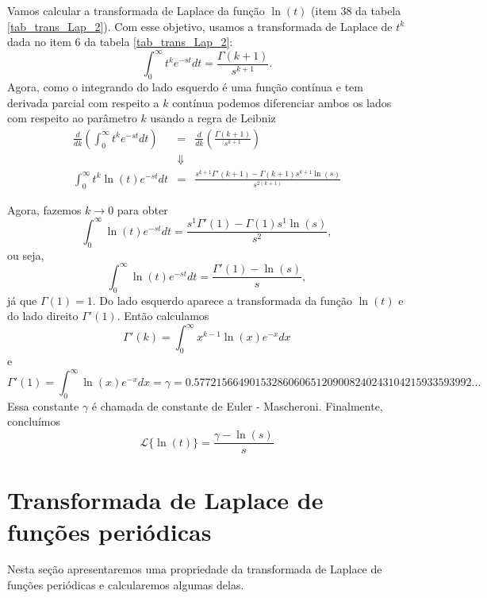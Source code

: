 \begin{ex}Vamos calcular a transformada de Laplace da função $\ln(t)$ (item 38 da tabela \ref{tab_trans_Lap_2}). Com esse objetivo, usamos a transformada de Laplace de $t^k$ dada no item 6 da tabela \ref{tab_trans_Lap_2}:
$$
\int_0^\infty t^ke^{-st}dt=\frac{\Gamma(k+1)}{s^{k+1}}.
$$
Agora, como o integrando do lado esquerdo é uma função contínua e tem derivada parcial com respeito a $k$ contínua podemos diferenciar ambos os lados com respeito ao parâmetro $k$ usando a regra de Leibniz
\begin{eqnarray*}
\frac{d}{dk}\left(\int_0^\infty t^ke^{-st}dt\right)&=&\frac{d}{dk}\left(\frac{\Gamma(k+1)}{s^{k+1}}\right)\\
&\Downarrow&\\
\int_0^\infty t^k \ln(t) e^{-st}dt&=&\frac{s^{k+1}\Gamma'(k+1)-\Gamma(k+1)s^{k+1}\ln(s)}{s^{2(k+1)}}
\end{eqnarray*}


Agora, fazemos $k\to 0$ para obter
$$
\int_0^\infty \ln(t) e^{-st}dt=\frac{s^{1}\Gamma'(1)-\Gamma(1)s^{1}\ln(s)}{s^{2}},
$$
ou seja,
$$
\int_0^\infty \ln(t) e^{-st}dt=\frac{\Gamma'(1)-\ln(s)}{s},
$$
já que $\Gamma(1)=1$. Do lado esquerdo aparece a transformada da função $\ln(t)$ e do lado direito $\Gamma'(1)$. Então calculamos
$$
\Gamma'(k)=\int_0^\infty x^{k-1}\ln(x) e^{-x}dx
$$
e
$$
\Gamma'(1)=\int_0^\infty \ln(x) e^{-x} dx=\gamma=0.57721566490153286060651209008240243104215933593992 ...
$$
Essa constante $\gamma$ é chamada de constante de Euler - Mascheroni. Finalmente, concluímos
$$
\mathcal{L}\{\ln(t)\}=\frac{\gamma-\ln(s)}{s}
$$

\end{ex}
 
 
 
\section{Transformada de Laplace de funções periódicas}
Nesta seção apresentaremos uma propriedade da transformada de Laplace de funções periódicas e calcularemos algumas delas.

